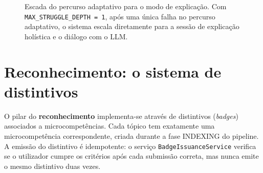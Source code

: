 \begin{figure}[H]
	\centering
	\caption[Escada progressiva para o modo de explica\c{c}\~ao]{Escada do percurso adaptativo para o modo de explica\c{c}\~ao. Com \texttt{MAX\_STRUGGLE\_DEPTH = 1}, ap\'os uma \'unica falha no percurso adaptativo, o sistema escala diretamente para a sess\~ao de explica\c{c}\~ao hol\'istica e o di\'alogo com o LLM.}
	\label{fig:escalada-ia}
\end{figure}

\section{Reconhecimento: o sistema de distintivos}
\label{sec:badges}

O pilar do \textbf{reconhecimento} implementa-se atrav\'es de distintivos
(\emph{badges}) associados a microcompet\^encias. Cada t\'opico tem
exatamente uma microcompet\^encia correspondente, criada durante a fase
INDEXING do pipeline. A emiss\~ao do distintivo \'e idempotente: o
servi\c{c}o \texttt{BadgeIssuanceService} verifica se o utilizador cumpre
os crit\'erios ap\'os cada submiss\~ao correta, mas nunca emite o mesmo
distintivo duas vezes.

